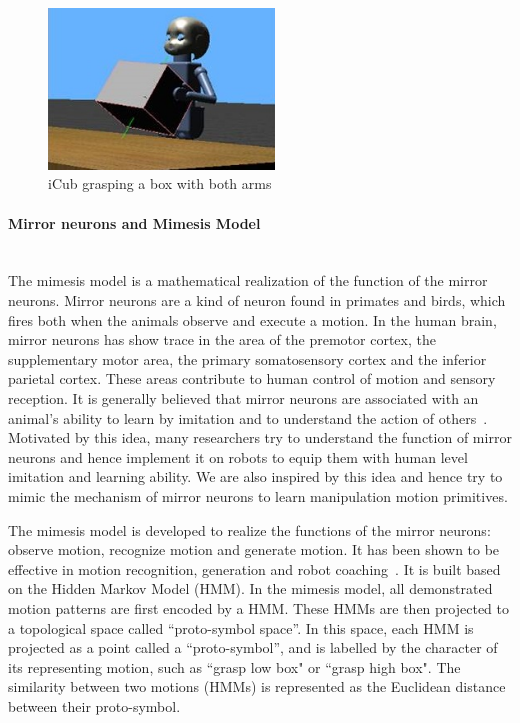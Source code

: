\begin{figure}
  \centering
  \includegraphics[width=6cm]{./fig_cha5/begin.jpg}
  \caption{ \scriptsize{iCub grasping a box with both arms}
}
    \label{begin}
    \vspace{-0.5cm}
\end{figure}



\paragraph{Mirror neurons and Mimesis Model} ~\\
The mimesis model is a mathematical realization of the function of the mirror neurons. Mirror neurons are a kind of neuron found in primates and birds, which fires both when the animals observe and execute a motion. In the human brain, mirror neurons has show trace
in the area of the premotor cortex, the supplementary motor area, the primary somatosensory cortex and the inferior parietal cortex. These areas contribute to human control of motion and sensory reception. It is generally believed that mirror neurons are associated with an animal's ability to learn by imitation and to understand the action of others~\citep{rizzolatti2004mirror}. Motivated by this idea, many researchers try to understand the function of mirror neurons and hence implement it on robots to equip them with human level imitation and learning ability. We are also inspired by this idea and hence try to mimic the mechanism of mirror neurons to learn manipulation motion primitives.

The mimesis model is developed to realize the functions of the mirror neurons: observe motion, recognize motion and generate motion.
It has been shown to be effective in motion recognition, generation and robot coaching~\citep{inamura2008geometric,okuno2011motion}. It is built based on the Hidden Markov Model (HMM).
In the mimesis model, all demonstrated motion patterns are first encoded by a HMM. These HMMs are then projected to a topological space called ``proto-symbol space''. In this space, each HMM is projected as a point called a ``proto-symbol'', and is labelled by the character of its representing motion, such as ``grasp low box" or ``grasp high box". The similarity between two motions (HMMs) is represented as the Euclidean distance between their proto-symbol.

